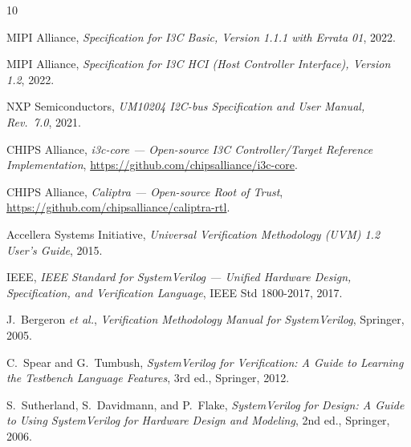\documentclass[12pt, a4paper, oneside]{report}
\begin{document}

\begin{thebibliography}{10}

MIPI Alliance,
\textit{Specification for I3C Basic, Version 1.1.1 with Errata 01},
2022.

MIPI Alliance,
\textit{Specification for I3C HCI (Host Controller Interface), Version 1.2},
2022.

NXP Semiconductors,
\textit{UM10204 I2C-bus Specification and User Manual, Rev.\ 7.0},
2021.

CHIPS Alliance,
\textit{i3c-core --- Open-source I3C Controller/Target Reference Implementation},
\url{https://github.com/chipsalliance/i3c-core}.

CHIPS Alliance,
\textit{Caliptra --- Open-source Root of Trust},
\url{https://github.com/chipsalliance/caliptra-rtl}.

Accellera Systems Initiative,
\textit{Universal Verification Methodology (UVM) 1.2 User's Guide},
2015.

IEEE,
\textit{IEEE Standard for SystemVerilog --- Unified Hardware Design, Specification,
and Verification Language},
IEEE Std 1800-2017, 2017.

J.~Bergeron \textit{et al.},
\textit{Verification Methodology Manual for SystemVerilog},
Springer, 2005.

C.~Spear and G.~Tumbush,
\textit{SystemVerilog for Verification: A Guide to Learning the Testbench
Language Features}, 3rd ed., Springer, 2012.

S.~Sutherland, S.~Davidmann, and P.~Flake,
\textit{SystemVerilog for Design: A Guide to Using SystemVerilog for Hardware
Design and Modeling}, 2nd ed., Springer, 2006.

\end{thebibliography}
\end{document}
